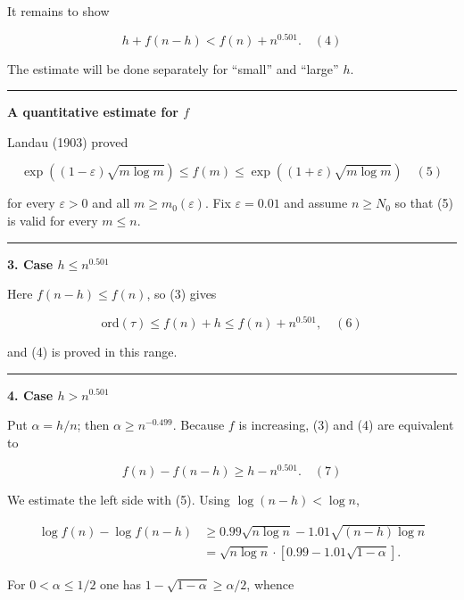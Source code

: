 \documentclass[12pt,a4paper]{article}
\theoremstyle{definition}
\begin{document}
    It remains to show

    \begin{equation}
        h + f(n-h) < f(n) + n^{0.501}. \quad {(4)}
    \end{equation}

    The estimate will be done separately for ``small'' and ``large'' $h$.

    \rule{\textwidth}{0.4pt}
    \textbf{A quantitative estimate for $f$}

    Landau (1903) proved

    \begin{equation}
        \exp((1-\varepsilon)\sqrt{m \log m}) \leq f(m) \leq \exp((1+\varepsilon)\sqrt{m \log m}) \quad {(5)}
    \end{equation}

    for every $\varepsilon > 0$ and all $m \geq m_0(\varepsilon)$.
    Fix $\varepsilon = 0.01$ and assume $n \geq N_0$ so that (5) is valid for every $m \leq n$.

    \rule{\textwidth}{0.4pt}
    \textbf{3. Case $h \leq n^{0.501}$}

    Here $f(n-h) \leq f(n)$, so (3) gives

    \begin{equation}
        \text{ord}(\tau) \leq f(n) + h \leq f(n) + n^{0.501}, \quad {(6)}
    \end{equation}

    and (4) is proved in this range.

    \rule{\textwidth}{0.4pt}
    \textbf{4. Case $h > n^{0.501}$}

    Put $\alpha = h/n$; then $\alpha \geq n^{-0.499}$.
    Because $f$ is increasing, (3) and (4) are equivalent to

    \begin{equation}
        f(n) - f(n-h) \geq h - n^{0.501}. \quad {(7)}
    \end{equation}

    We estimate the left side with (5). Using $\log(n-h) < \log n$,

    \begin{align}
        \log f(n) - \log f(n-h) &\geq 0.99\sqrt{n \log n} - 1.01\sqrt{(n-h) \log n} \\
        &= \sqrt{n \log n} \cdot [0.99 - 1.01\sqrt{1-\alpha}].
    \end{align}

    For $0 < \alpha \leq 1/2$ one has $1 - \sqrt{1-\alpha} \geq \alpha/2$, whence
\end{document}
